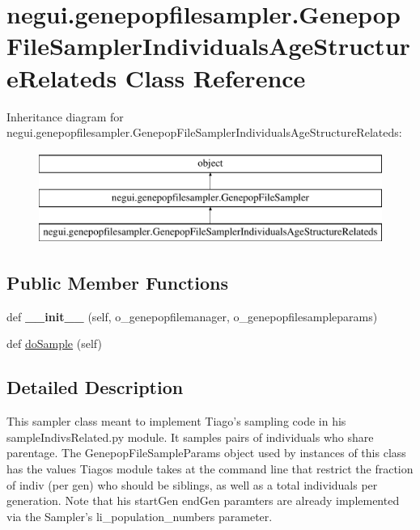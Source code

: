 \hypertarget{classnegui_1_1genepopfilesampler_1_1GenepopFileSamplerIndividualsAgeStructureRelateds}{}\section{negui.\+genepopfilesampler.\+Genepop\+File\+Sampler\+Individuals\+Age\+Structure\+Relateds Class Reference}
\label{classnegui_1_1genepopfilesampler_1_1GenepopFileSamplerIndividualsAgeStructureRelateds}
Inheritance diagram for negui.\+genepopfilesampler.\+Genepop\+File\+Sampler\+Individuals\+Age\+Structure\+Relateds\+:\begin{figure}[H]
\begin{center}
\leavevmode
\includegraphics[height=3.000000cm]{classnegui_1_1genepopfilesampler_1_1GenepopFileSamplerIndividualsAgeStructureRelateds}
\end{center}
\end{figure}
\subsection*{Public Member Functions}
\begin{DoxyCompactItemize}
\item 
def {\bfseries \+\_\+\+\_\+init\+\_\+\+\_\+} (self, o\+\_\+genepopfilemanager, o\+\_\+genepopfilesampleparams)\hypertarget{classnegui_1_1genepopfilesampler_1_1GenepopFileSamplerIndividualsAgeStructureRelateds_aa74e2bb52923a31c31a6a2ca54bda6e0}{}\label{classnegui_1_1genepopfilesampler_1_1GenepopFileSamplerIndividualsAgeStructureRelateds_aa74e2bb52923a31c31a6a2ca54bda6e0}

\item 
def \hyperlink{classnegui_1_1genepopfilesampler_1_1GenepopFileSamplerIndividualsAgeStructureRelateds_a2c1d8215c48697cf7f81ba45c31435aa}{do\+Sample} (self)
\end{DoxyCompactItemize}


\subsection{Detailed Description}
\begin{DoxyVerb}This sampler class meant to implement Tiago's sampling code in his
sampleIndivsRelated.py module.  It samples pairs of individuals who
share parentage.  The GenepopFileSampleParams object used by instances
of this class has the values Tiagos module takes at the command line 
that restrict the fraction of indiv (per gen) who should be siblings,
as well as a total individuals per generation.  Note that his
startGen endGen paramters are already implemented via the Sampler's
li_population_numbers parameter.
\end{DoxyVerb}
 

